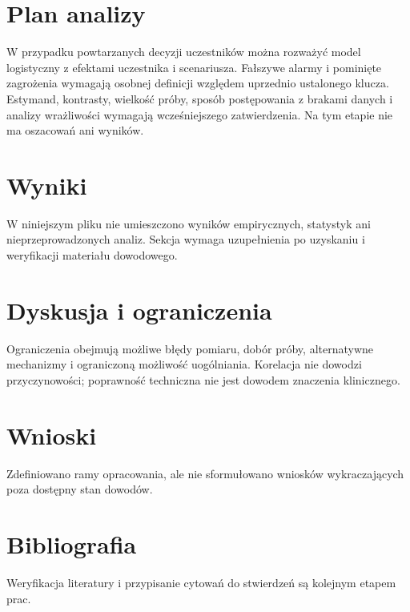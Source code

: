 \documentclass[11pt,a4paper]{article}
\begin{document}
\section{Plan analizy}

W przypadku powtarzanych decyzji uczestników można rozważyć model logistyczny z efektami uczestnika i scenariusza. Fałszywe alarmy i pominięte zagrożenia wymagają osobnej definicji względem uprzednio ustalonego klucza. Estymand, kontrasty, wielkość próby, sposób postępowania z brakami danych i analizy wrażliwości wymagają wcześniejszego zatwierdzenia. Na tym etapie nie ma oszacowań ani wyników.

\section{Wyniki}

W niniejszym pliku nie umieszczono wyników empirycznych, statystyk ani nieprzeprowadzonych analiz. Sekcja wymaga uzupełnienia po uzyskaniu i weryfikacji materiału dowodowego.

\section{Dyskusja i ograniczenia}

Ograniczenia obejmują możliwe błędy pomiaru, dobór próby, alternatywne mechanizmy i ograniczoną możliwość uogólniania. Korelacja nie dowodzi przyczynowości; poprawność techniczna nie jest dowodem znaczenia klinicznego.

\section{Wnioski}

Zdefiniowano ramy opracowania, ale nie sformułowano wniosków wykraczających poza dostępny stan dowodów.

\section*{Bibliografia}

Weryfikacja literatury i przypisanie cytowań do stwierdzeń są kolejnym etapem prac.
\end{document}
